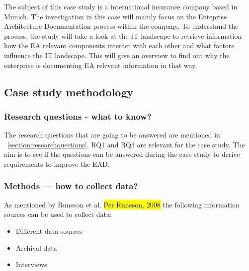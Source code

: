 The subject of this case study is a international insurance company based in Munich. The investigation in this case will mainly focus on the Enteprise Architecture Documentation process within the company. To understand the process, the study will take a look at the IT landscape to retrieve information how the EA relevant components interact with each other and what factors influence the IT landscape. This will give an overview to find out why the enterprise is documenting EA relevant information in that way.

\subsection{Case study methodology}\label{subsection:casestudymethodology}

\subsubsection{Research questions -  what to know?}
The research questions that are going to be answered are mentioned in ~\ref{section:researchquestions}.
RQ1 and RQ3 are relevant for the case study. The aim is to see if the questions can be answered during the case study to derive requirements to improve the EAD.

\subsubsection{Methods — how to collect data?}

As mentioned by Runeson et al. \hl{Per Runeson, 2008} the following information sources can be used to collect data:

\begin{itemize}
    \item Different data sources
    \item Archival data
    \item Interviews
\end{itemize}


